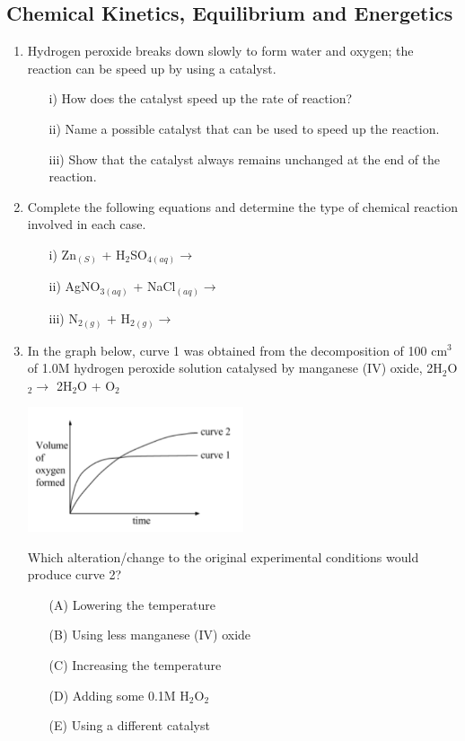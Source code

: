 \subsection{Chemical Kinetics, Equilibrium and Energetics}

\begin{enumerate}
	\item Hydrogen peroxide breaks down slowly to form water and oxygen; the reaction can be speed up by using a catalyst.
		\begin{enumerate}[topsep=0ex,itemsep=0ex,partopsep=1ex,parsep=1ex]
		\item[i)] How does the catalyst speed up the rate of reaction?
		\item[ii)] Name a possible catalyst that can be used to speed up the reaction.
		\item[iii)] Show that the catalyst always remains unchanged at the end of the reaction.
	\end{enumerate}
	
	\item Complete the following equations and determine the type of chemical reaction involved in each case.
		\begin{enumerate}[topsep=0ex,itemsep=0ex,partopsep=1ex,parsep=1ex]
		\item[i)] Zn$_{(S)}$ + H$_2$SO$_{4 (aq)} \rightarrow$
		\item[ii)] AgNO$_{3 (aq)}$ + NaCl$_{(aq)} \rightarrow$
		\item[iii)] N$_{2 (g)}$ + H$_{2 (g)} \rightarrow$
	\end{enumerate}
	
	\item In the graph below, curve 1 was obtained from the decomposition of 100 cm$^3$ of 1.0M hydrogen peroxide solution catalysed by manganese (IV) oxide, 2H$_2$O$_2 \rightarrow$ 2H$_2$O + O$_2$ \\
	\begin{center}
		\includegraphics[width=0.5\textwidth]{./img/chem_III_kinetics_1.png}
	\end{center}
	Which alteration\slash change to the original experimental conditions would produce curve 2?
	\begin{enumerate}[topsep=0ex,itemsep=0ex,partopsep=1ex,parsep=1ex]
		\item[(A)] Lowering the temperature
		\item[(B)] Using less manganese (IV) oxide
		\item[(C)] Increasing the temperature
		\item[(D)] Adding some 0.1M H$_2$O$_2$ 
		\item[(E)] Using a different catalyst
	\end{enumerate}


\end{enumerate}
